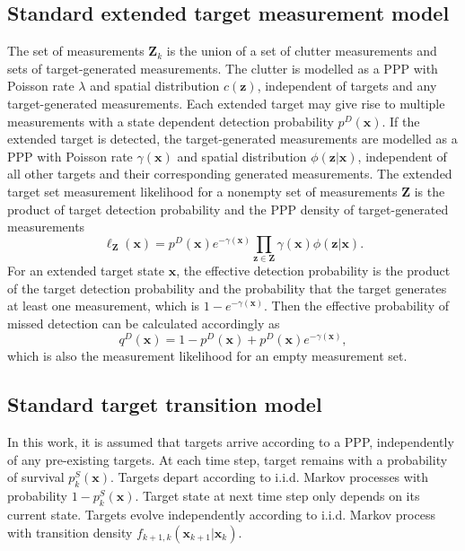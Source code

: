 \documentclass[conference]{IEEEtran}
\begin{document}
\subsection{Standard extended target measurement model}
The set of measurements $\mathbf{Z}_k$ is the union of a set of clutter measurements and sets of target-generated measurements. The clutter is modelled as a PPP with Poisson rate $\lambda$ and spatial distribution $c(\mathbf{z})$, independent of targets and any target-generated measurements. Each extended target may give rise to multiple measurements with a state dependent detection probability $p^D(\mathbf{x})$. If the extended target is detected, the target-generated measurements are modelled as a PPP with Poisson rate $\gamma(\mathbf{x})$ and spatial distribution $\phi(\mathbf{z}|\mathbf{x})$, independent of all other targets and their corresponding generated measurements. The extended target set measurement likelihood for a nonempty set of measurements $\mathbf{Z}$ is the product of target detection probability and the PPP density of target-generated measurements \cite{pmbmextended2}
\begin{equation}
    \ell_{\mathbf{Z}}(\mathbf{x}) = p^D(\mathbf{x})e^{-\gamma(\mathbf{x})}\prod_{\mathbf{z}\in \mathbf{Z}}\gamma(\mathbf{x})\phi(\mathbf{z}|\mathbf{x}).
    \label{eq:extendedlikelihood}
\end{equation}
For an extended target state $\mathbf{x}$, the effective detection probability is the product of the target detection probability and the probability that the target generates at least one measurement, which is $1-e^{-\gamma(\mathbf{x})}$. Then the effective probability of missed detection can be calculated accordingly as
\begin{equation}
    q^D(\mathbf{x}) = 1 - p^D(\mathbf{x}) + p^D(\mathbf{x})e^{-\gamma(\mathbf{x})},
\end{equation}
which is also the measurement likelihood for an empty measurement set.

\subsection{Standard target transition model}
In this work, it is assumed that targets arrive according to a PPP, independently of any pre-existing targets. At each time step, target remains with a probability of survival $p^S_k(\mathbf{x})$. Targets depart according to i.i.d. Markov processes with probability $1-p^S_k(\mathbf{x})$. Target state at next time step only depends on its current state. Targets evolve independently according to i.i.d. Markov process with transition density $f_{k+1,k}(\mathbf{x}_{k+1}|\mathbf{x}_{k})$. 
\end{document}
